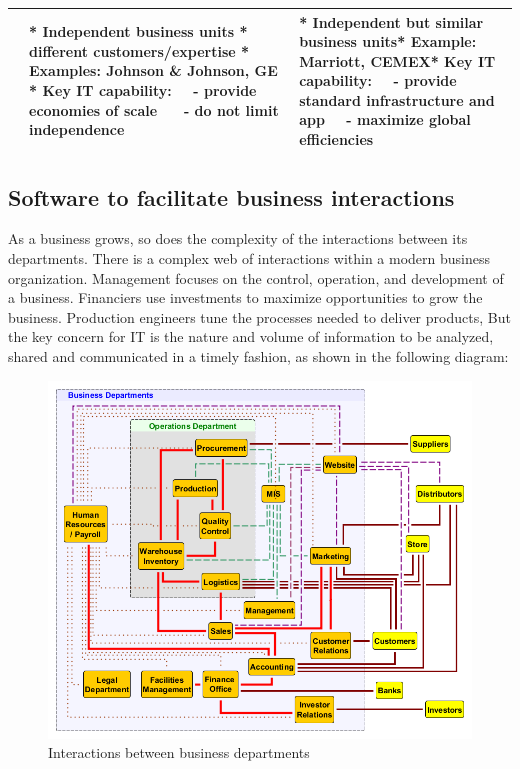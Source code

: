 \documentclass[]{book}
\begin{document}
\begin{longtable}[]{@{}cll@{}}
\begin{minipage}[t]{0.14\columnwidth}
\end{minipage} & \begin{minipage}[t]{0.45\columnwidth}\raggedright
* Independent business units * different customers/expertise * Examples: Johnson \& Johnson, GE * Key IT capability:~~ - provide economies of scale ~~ - do not limit independence\strut
\end{minipage} & \begin{minipage}[t]{0.32\columnwidth}\raggedright
* Independent but similar business units* Example: Marriott, CEMEX* Key IT capability:~~ - provide standard infrastructure and app~~ - maximize global efficiencies\strut
\end{minipage}\tabularnewline
\bottomrule
\end{longtable}

\hypertarget{software-to-facilitate-business-interactions}{%
\subsection{Software to facilitate business interactions}\label{software-to-facilitate-business-interactions}}

As a business grows, so does the complexity of the interactions between its departments. There is a complex web of interactions within a modern business organization. Management focuses on the control, operation, and development of a business. Financiers use investments to maximize opportunities to grow the business. Production engineers tune the processes needed to deliver products, But the key concern for IT is the nature and volume of information to be analyzed, shared and communicated in a timely fashion,
as shown in the following diagram:

\begin{figure}
\centering
\includegraphics{images/businessdepts.png}
\caption{Interactions between business departments}
\end{figure}
\end{document}
